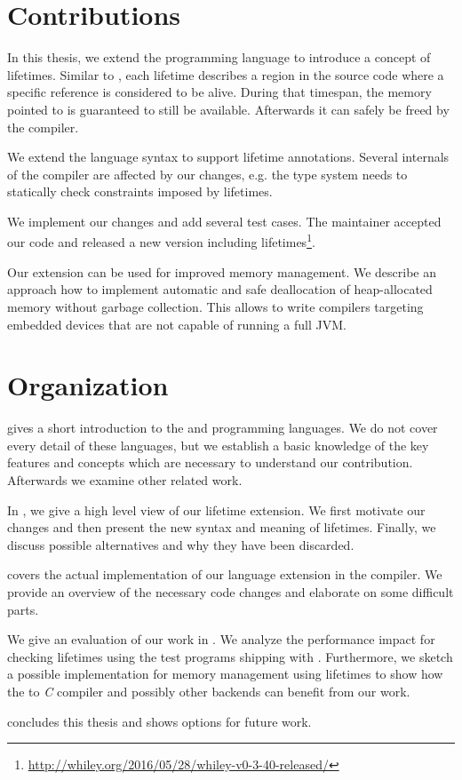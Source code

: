 \section{Contributions}

In this thesis, we extend the \whiley programming language to introduce a concept of lifetimes.
Similar to \rust, each lifetime describes a region in the source code where a specific reference is considered to be alive.
During that timespan, the memory pointed to is guaranteed to still be available.
Afterwards it can safely be freed by the compiler.

We extend the language syntax to support lifetime annotations.
Several internals of the \whiley compiler are affected by our changes, e.g. the type system needs to statically check constraints imposed by lifetimes.

We implement our changes and add several test cases.
The \whiley maintainer accepted our code and released a new version including lifetimes\footnote{\url{http://whiley.org/2016/05/28/whiley-v0-3-40-released/}}.

Our extension can be used for improved memory management.
We describe an approach how to implement automatic and safe deallocation of heap-allocated memory without garbage collection.
This allows to write \whiley compilers targeting embedded devices that are not capable of running a full JVM.


\section{Organization}

 gives a short introduction to the \whiley and \rust programming languages.
We do not cover every detail of these languages, but we establish a basic knowledge of the key features and concepts which are necessary to understand our contribution.
Afterwards we examine other related work.

In , we give a high level view of our lifetime extension.
We first motivate our changes and then present the new syntax and meaning of lifetimes.
Finally, we discuss possible alternatives and why they have been discarded.

 covers the actual implementation of our language extension in the \whiley compiler.
We provide an overview of the necessary code changes and elaborate on some difficult parts.

We give an evaluation of our work in .
We analyze the performance impact for checking lifetimes using the test programs shipping with \whiley.
Furthermore, we sketch a possible implementation for memory management using lifetimes to show how the \whiley to \emph{C} compiler and possibly other backends can benefit from our work.

 concludes this thesis and shows options for future work.
